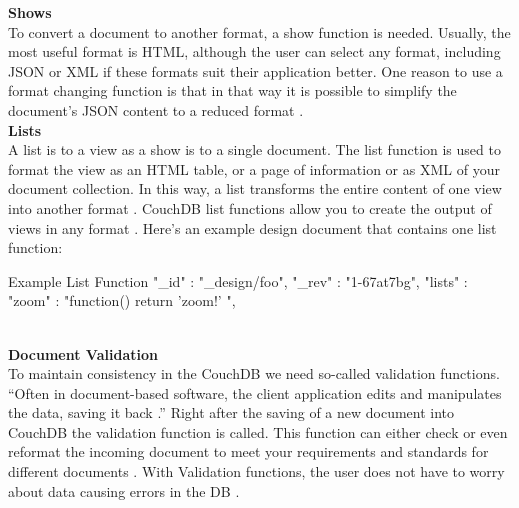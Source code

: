 \newline
\textbf{Shows} \\
To convert a document to another format, a show function is needed. Usually, the most useful format is HTML, although the user can select any format, including JSON or XML if these formats suit their application better. One reason to use a format changing function is that in that way it is possible to simplify the document's JSON content to a reduced format \parencite{Brown.2012}.\\
\newline
\textbf{Lists} \\
A list is to a view as a show is to a single document. The list function is used to format the view as an HTML table, or a page of information or as XML of your document collection. In this way, a list transforms the entire content of one view into another format \parencite{Brown.2012}. CouchDB list functions allow you to create the output of views in any format \parencite{CouchDB.Guide}.
Here’s an example \parencite{CouchDB.Guide} design document that contains one list function:
\begin{mylisting}{Example List Function \parencite{CouchDB.Guide}}
{
  "_id" : "_design/foo",
  "_rev" : "1-67at7bg",
  "lists" : {
    "zoom" : "function() { return 'zoom!' }",
  }
}
\end{mylisting} \\
%
\textbf{Document Validation} \\
To maintain consistency in the CouchDB we need so-called validation functions. ``Often in document-based software, the client application edits and manipulates the data, saving it back \parencite{CouchDB.Guide}.'' Right after the saving of a new document into CouchDB the validation function is called. This function can either check or even reformat the incoming document to meet your requirements and standards for different documents \parencite{Brown.2012}. With Validation functions, the user does not have to worry about data causing errors in the DB \parencite{CouchDB.Guide}. \\
